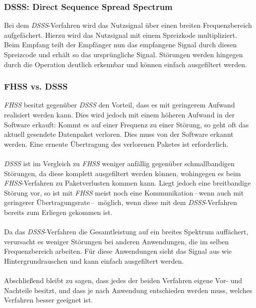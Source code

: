         \subsubsection{DSSS: Direct Sequence Spread Spectrum}\label{DSSS}
            Bei dem \textsl{DSSS}-Verfahren wird das Nutzsignal über einen breiten Frequenzbereich
            aufgefächert. Hierzu wird das Nutzsignal mit einem Spreizkode multipliziert. 
            Beim Empfang teilt der Empfänger nun das empfangene Signal durch diesen Spreizcode
            und erhält so das ursprüngliche Signal. Störungen werden hingegen durch die 
            Operation deutlich erkennbar und können einfach ausgefiltert werden.
        \subsubsection{FHSS vs. DSSS}\label{FHSSvsDSSS}
            \textsl{FHSS} besitzt gegenüber \textsl{DSSS} den Vorteil, dass es mit geringerem Aufwand
            realisiert werden kann. 
            Dies wird jedoch mit einem höheren Aufwand in der Software erkauft: Kommt es auf einer
            Frequenz zu einer Störung, so geht oft das aktuell gesendete Datenpaket verloren.
            Dies muss von der Software erkannt werden. Eine erneute Übertragung des verlorenen
            Paketes ist erforderlich.\\
            \\
            \textsl{DSSS} ist im Vergleich zu \textsl{FHSS} weniger anfällig gegenüber
            schmallbandigen Störungen, da diese komplett ausgefiltert werden können, 
            wohingegen es beim \textsl{FHSS}-Verfahren zu Paketverlusten kommen kann.
            Liegt jedoch eine breitbandige Störung vor, so ist mit \textsl{FHSS}
            meist noch eine Kommunikation\,--\,wenn auch mit geringerer Übertragungsrate\,--\,
            möglich, wenn diese mit dem \textsl{DSSS}-Verfahren bereits zum Erliegen gekommen ist.\\
            \\
            Da das \textsl{DSSS}-Verfahren die Gesamtleistung auf ein breites Spektrum auffächert,
            verursacht es weniger Störungen bei anderen Anwendungen, die im selben Frequenzbereich
            arbeiten. Für diese Anwendungen sieht das Signal aus wie Hintergrundrauschen und kann
            einfach ausgefiltert werden.\\
            \\
            Abschließend bleibt zu sagen, dass jedes der beiden Verfahren eigene Vor- und Nachteile
            besitzt, und dass je nach Anwendung entschieden werden muss, welches Verfahren
            besser geeignet ist.


